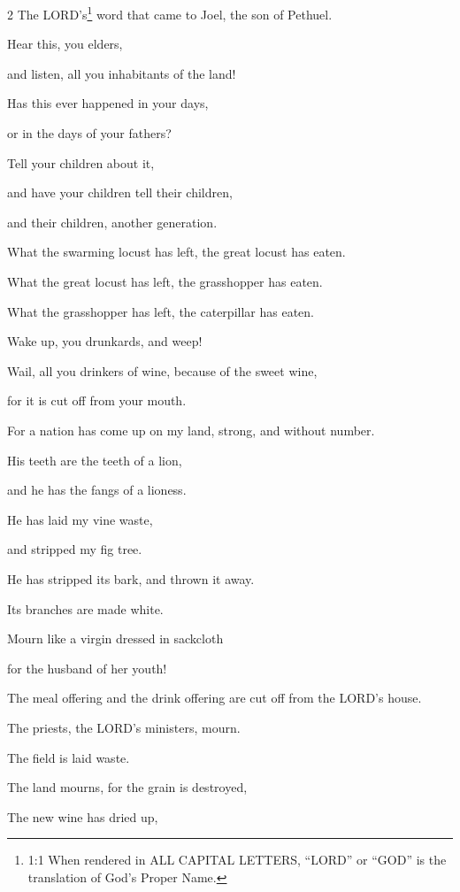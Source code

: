 \begin{multicols}{2}
\mychapter{} \myverse*{}The LORD’s\footnote{1:1 When rendered in ALL CAPITAL LETTERS, “LORD” or “GOD” is the translation of God’s Proper Name.}
word that came to Joel, the son of Pethuel.

\myverse{}Hear this, you elders,

and listen, all you inhabitants of the land!

Has this ever happened in your days,

or in the days of your fathers?

\myverse{}Tell your children about it,

and have your children tell their children,

and their children, another generation.

\myverse{}What the swarming locust has left, the great locust has eaten.

What the great locust has left, the grasshopper has eaten.

What the grasshopper has left, the caterpillar has eaten.

\myverse{}Wake up, you drunkards, and weep!

Wail, all you drinkers of wine, because of the sweet wine,

for it is cut off from your mouth.

\myverse{}For a nation has come up on my land, strong, and without number.

His teeth are the teeth of a lion,

and he has the fangs of a lioness.

\myverse{}He has laid my vine waste,

and stripped my fig tree.

He has stripped its bark, and thrown it away.

Its branches are made white.

\myverse{}Mourn like a virgin dressed in sackcloth

for the husband of her youth!

\myverse{}The meal offering and the drink offering are cut off from the
LORD’s house.

The priests, the LORD’s ministers, mourn.

\myverse{}The field is laid waste.

The land mourns, for the grain is destroyed,

The new wine has dried up,


\end{multicols}
